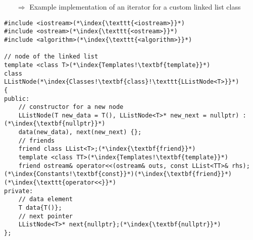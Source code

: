 \documentclass[10pt]{article}
\begin{document}
\begin{enumerate}
\item[$\Rightarrow$] Example implementation of an iterator for a custom linked list class
\end{enumerate}
\begin{lstlisting}
#include <iostream>(*\index{\texttt{<iostream>}}*)
#include <ostream>(*\index{\texttt{<ostream>}}*)
#include <algorithm>(*\index{\texttt{<algorithm>}}*)

// node of the linked list
template <class T>(*\index{Templates!\textbf{template}}*)
class LListNode(*\index{Classes!\textbf{class}!\texttt{LListNode<T>}}*)
{
public:
    // constructor for a new node
    LListNode(T new_data = T(), LListNode<T>* new_next = nullptr) :(*\index{\textbf{nullptr}}*)
    data(new_data), next(new_next) {};
    // friends
    friend class LList<T>;(*\index{\textbf{friend}}*)
    template <class TT>(*\index{Templates!\textbf{template}}*)
    friend ostream& operator<<(ostream& outs, const LList<TT>& rhs);(*\index{Constants!\textbf{const}}*)(*\index{\textbf{friend}}*)(*\index{\texttt{operator<<}}*)
private:
    // data element
    T data{T()};
    // next pointer
    LListNode<T>* next{nullptr};(*\index{\textbf{nullptr}}*)
};


\end{lstlisting}
\end{document}
